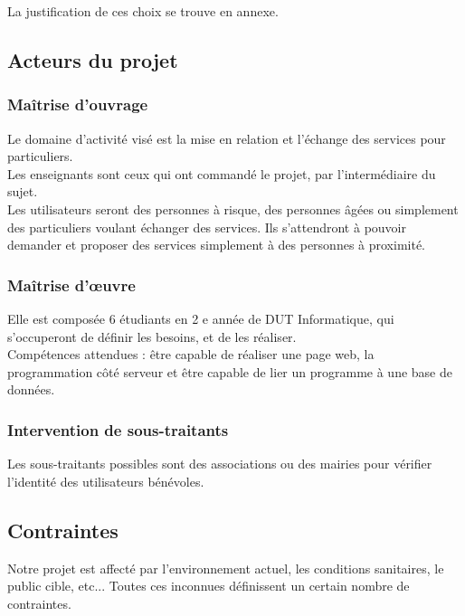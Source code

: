 \documentclass[a4paper,11pt]{article}
\begin{document}
La justification de ces choix se trouve en annexe.\\

\subsection{Acteurs du projet}
\subsubsection{Maîtrise d’ouvrage}

Le domaine d’activité visé est la mise en relation et l’échange des services pour particuliers.\\

Les enseignants sont ceux qui ont commandé le projet, par l’intermédiaire du sujet.\\

Les utilisateurs seront des personnes à risque, des personnes âgées ou simplement des particuliers
voulant échanger des services. Ils s’attendront à pouvoir demander et proposer des services
simplement à des personnes à proximité.\\

\subsubsection{Maîtrise d'œuvre}

Elle est composée 6 étudiants en 2 e année de DUT Informatique, qui s’occuperont de définir les
besoins, et de les réaliser.\\

Compétences attendues : être capable de réaliser une page web, la programmation côté serveur et
être capable de lier un programme à une base de données.\\

\subsubsection{Intervention de sous-traitants}

Les sous-traitants possibles sont des associations ou des mairies pour vérifier l’identité des utilisateurs
bénévoles.\\

\subsection{Contraintes}

Notre projet est affecté par l’environnement actuel, les conditions sanitaires, le public cible, etc...
Toutes ces inconnues définissent un certain nombre de contraintes.\\
\end{document}
